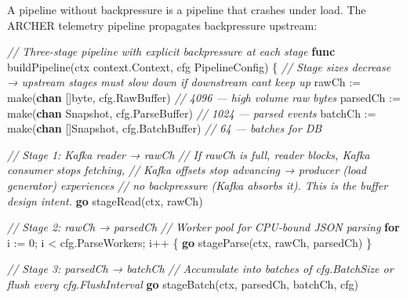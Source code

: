 \documentclass[
]{article}
\newenvironment{Shaded}{}{}
\newcommand{\BuiltInTok}[1]{\textcolor[rgb]{0.00,0.50,0.00}{#1}}
\newcommand{\CommentTok}[1]{\textcolor[rgb]{0.38,0.63,0.69}{\textit{#1}}}
\newcommand{\ControlFlowTok}[1]{\textcolor[rgb]{0.00,0.44,0.13}{\textbf{#1}}}
\newcommand{\DataTypeTok}[1]{\textcolor[rgb]{0.56,0.13,0.00}{#1}}
\newcommand{\DecValTok}[1]{\textcolor[rgb]{0.25,0.63,0.44}{#1}}
\newcommand{\KeywordTok}[1]{\textcolor[rgb]{0.00,0.44,0.13}{\textbf{#1}}}
\newcommand{\NormalTok}[1]{#1}
\newcommand{\OperatorTok}[1]{\textcolor[rgb]{0.40,0.40,0.40}{#1}}
\begin{document}
A pipeline without backpressure is a pipeline that crashes under load.
The ARCHER telemetry pipeline propagates backpressure upstream:

\begin{Shaded}
\begin{Highlighting}[]
\CommentTok{// Three{-}stage pipeline with explicit backpressure at each stage}
\KeywordTok{func}\NormalTok{ buildPipeline}\OperatorTok{(}\NormalTok{ctx context}\OperatorTok{.}\NormalTok{Context}\OperatorTok{,}\NormalTok{ cfg PipelineConfig}\OperatorTok{)} \OperatorTok{\{}
    \CommentTok{// Stage sizes decrease → upstream stages must slow down if downstream can\textquotesingle{}t keep up}
\NormalTok{    rawCh    }\OperatorTok{:=} \BuiltInTok{make}\OperatorTok{(}\KeywordTok{chan} \OperatorTok{[]}\DataTypeTok{byte}\OperatorTok{,}\NormalTok{    cfg}\OperatorTok{.}\NormalTok{RawBuffer}\OperatorTok{)}   \CommentTok{// 4096 — high volume raw bytes}
\NormalTok{    parsedCh }\OperatorTok{:=} \BuiltInTok{make}\OperatorTok{(}\KeywordTok{chan}\NormalTok{ Snapshot}\OperatorTok{,}\NormalTok{  cfg}\OperatorTok{.}\NormalTok{ParseBuffer}\OperatorTok{)}  \CommentTok{// 1024 — parsed events}
\NormalTok{    batchCh  }\OperatorTok{:=} \BuiltInTok{make}\OperatorTok{(}\KeywordTok{chan} \OperatorTok{[]}\NormalTok{Snapshot}\OperatorTok{,}\NormalTok{ cfg}\OperatorTok{.}\NormalTok{BatchBuffer}\OperatorTok{)}  \CommentTok{// 64  — batches for DB}

    \CommentTok{// Stage 1: Kafka reader → rawCh}
    \CommentTok{// If rawCh is full, reader blocks, Kafka consumer stops fetching,}
    \CommentTok{// Kafka offsets stop advancing → producer (load generator) experiences}
    \CommentTok{// no backpressure (Kafka absorbs it). This is the buffer design intent.}
    \ControlFlowTok{go}\NormalTok{ stageRead}\OperatorTok{(}\NormalTok{ctx}\OperatorTok{,}\NormalTok{ rawCh}\OperatorTok{)}

    \CommentTok{// Stage 2: rawCh → parsedCh}
    \CommentTok{// Worker pool for CPU{-}bound JSON parsing}
    \ControlFlowTok{for}\NormalTok{ i }\OperatorTok{:=} \DecValTok{0}\OperatorTok{;}\NormalTok{ i }\OperatorTok{\textless{}}\NormalTok{ cfg}\OperatorTok{.}\NormalTok{ParseWorkers}\OperatorTok{;}\NormalTok{ i}\OperatorTok{++} \OperatorTok{\{}
        \ControlFlowTok{go}\NormalTok{ stageParse}\OperatorTok{(}\NormalTok{ctx}\OperatorTok{,}\NormalTok{ rawCh}\OperatorTok{,}\NormalTok{ parsedCh}\OperatorTok{)}
    \OperatorTok{\}}

    \CommentTok{// Stage 3: parsedCh → batchCh}
    \CommentTok{// Accumulate into batches of cfg.BatchSize or flush every cfg.FlushInterval}
    \ControlFlowTok{go}\NormalTok{ stageBatch}\OperatorTok{(}\NormalTok{ctx}\OperatorTok{,}\NormalTok{ parsedCh}\OperatorTok{,}\NormalTok{ batchCh}\OperatorTok{,}\NormalTok{ cfg}\OperatorTok{)}


\end{Highlighting}
\end{Shaded}
\end{document}
